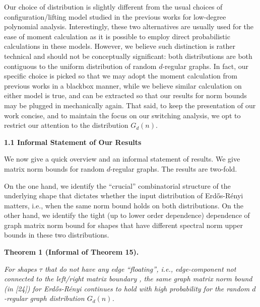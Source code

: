 \documentclass[10pt,a4paper]{article}
\begin{document}
Our choice of distribution is slightly different from the usual choices of configuration/lifting model studied in the previous works for low-degree polynomial analysis. Interestingly, these two alternatives are usually used for the ease of moment calculation as it is possible to employ direct probabilistic calculations in these models. However, we believe such distinction is rather technical and should not be conceptually significant:
both distributions are both contiguous to the uniform distribution of random $d$-regular graphs. In fact, our specific choice is picked so that we may adopt the moment calculation from previous works in a blackbox manner, while we believe similar calculation on either model is true, and can be extracted so that our results for norm bounds may be plugged in mechanically again. That said, to keep the presentation of our work concise, and to maintain the focus on our switching analysis, we opt to restrict our attention to the distribution $G_{d}(n)$.\par





\par\medskip\noindent\textbf{
1.1 Informal Statement of Our Results}\par




We now give a quick overview and an informal statement of results. We give matrix norm bounds for random $d$-regular graphs. The results are two-fold.\par




On the one hand, we identify the “crucial” combinatorial structure of the underlying shape that dictates whether the input distribution of Erdős-Rényi matters, i.e., when the same norm bound holds on both distributions. On the other hand, we identify the tight (up to lower order dependence) dependence of graph matrix norm bound for shapes that have different spectral norm upper bounds in these two distributions.\par





\par\medskip\noindent\textbf{
\textbf{Theorem 1}\textbf{ }(Informal of Theorem 15)\textbf{.}
}\par



\emph{For shapes $\tau$ that do not have any edge “floating”, i.e., edge-component not connected to the left/right matrix boundary , the same graph matrix norm bound (in [24]) for Erdős-Rényi continues to hold with high probability for the random $d$-regular graph distribution $G_{d}(n)$.}\par
\end{document}
